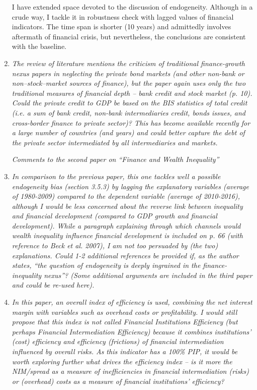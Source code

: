 \begin{enumerate}
    I have extended space devoted to the discussion of endogeneity. Although in a crude way, I tackle it in robustness check with lagged values of financial indicators. The time span is shorter (10 years) and admittedly involves aftermath of financial crisis, but nevertheless, the conclusions are consistent with the baseline.

    \item \textit{The review of literature mentions the criticism of traditional finance-growth nexus papers in neglecting the private bond markets (and other non-bank or non--stock--market sources of finance), but the paper again uses only the two traditional measures of financial depth -- bank credit and stock market (p. 10). Could the private credit to GDP be based on the BIS statistics of total credit (i.e. a sum of bank credit, non-bank intermediaries credit, bonds issues, and cross-border finance to private sector)? This has become available recently for a large number of countries (and years) and could better capture the debt of the private sector intermediated by all intermediaries and markets.}
    
    \textit{Comments to the second paper on ``Finance and Wealth Inequality''}

    \item \textit{In comparison to the previous paper, this one tackles well a possible endogeneity bias (section 3.5.3) by lagging the explanatory variables (average of 1980-2009) compared to the dependent variable (average of 2010-2016), although I would be less concerned about the reverse link between inequality and financial development (compared to GDP growth and financial development). While a paragraph explaining through which channels would wealth inequality influence financial development is included on p. 66 (with reference to Beck et al. 2007), I am not too persuaded by (the two) explanations. Could 1-2 additional references be provided if, as the author states, ``the question of endogeneity is deeply ingrained in the finance-inequality nexus''? (Some additional arguments are included in the third paper and could be re-used here).}
    
    \item \textit{In this paper, an overall index of efficiency is used, combining the net interest margin with variables such as overhead costs or profitability. I would still propose that this index is not called Financial Institutions Efficiency (but perhaps Financial Intermediation Efficiency) because it combines institutions' (cost) efficiency and efficiency (frictions) of financial intermediation influenced by overall risks. As this indicator has a 100\% PIP, it would be worth exploring further what drives the efficiency index -- is it more the NIM/spread as a measure of inefficiencies in financial intermediation (risks) or (overhead) costs as a measure of financial institutions' efficiency?}
    

\end{enumerate}
